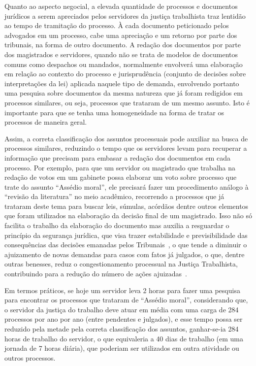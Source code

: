 Quanto ao aspecto negocial, a elevada quantidade de processos e documentos jurídicos a serem apreciados pelos servidores da justiça trabalhista traz lentidão ao tempo de tramitação do processo.  À cada documento peticionado pelos advogados em um processo, cabe uma apreciação e um retorno por parte dos tribunais, na forma de outro documento. A redação dos documentos por parte dos magistrados e servidores, quando não se trata de modelos de documentos comuns como despachos ou mandados, normalmente envolverá uma elaboração em relação ao contexto do processo e jurisprudência (conjunto de decisões sobre interpretações da lei) aplicada naquele tipo de demanda, envolvendo portanto uma pesquisa sobre documentos da mesma natureza que já foram redigidos em processos similares, ou seja, processos que trataram de um mesmo assunto. Isto é importante para que se tenha uma homogeneidade na forma de tratar os processos de maneira geral. 

Assim, a correta classificação dos assuntos processuais pode auxiliar na busca de processos similares, reduzindo o tempo que os servidores levam para recuperar a informação que precisam para embasar a redação dos documentos em cada processo. Por exemplo, para que um servidor ou magistrado que trabalha na redação de votos em um gabinete possa elaborar um voto sobre processo que trate do assunto “Assédio moral”, ele precisará fazer um procedimento análogo à “revisão da literatura” no meio acadêmico, recorrendo a processos que já trataram deste tema para buscar leis, súmulas, acórdãos dentre outros elementos que foram utilizados na elaboração da decisão final de um magistrado. Isso não só facilita o trabalho da elaboração do documento mas auxilia a resguardar o princípio da segurança jurídica, que visa trazer estabilidade e previsibilidade das consequências das decisões emanadas pelos Tribunais~\cite{segurancajuridica}, o que tende a diminuir o ajuizamento de novas demandas para casos com fatos já julgados, o que, dentre outras benesses, reduz o congestionamento processual na Justiça Trabalhista, contribuindo para a redução do número de ações ajuizadas~\cite{carvalho_o_2017}.

Em termos práticos, se hoje um servidor leva 2 horas para fazer uma pesquisa para encontrar os processos que trataram de “Assédio moral”, considerando que, o servidor da justiça do trabalho deve atuar em média com uma carga de 284 processos por ano por ano (entre pendentes e julgados)\cite{justicaemnumeros2017}, e esse tempo possa ser reduzido pela metade pela correta classificação dos assuntos, ganhar-se-ia 284 horas de trabalho do servidor, o que equivaleria a 40 dias de trabalho (em uma jornada de 7 horas diária), que poderiam ser utilizados em outra atividade ou outros processos.

